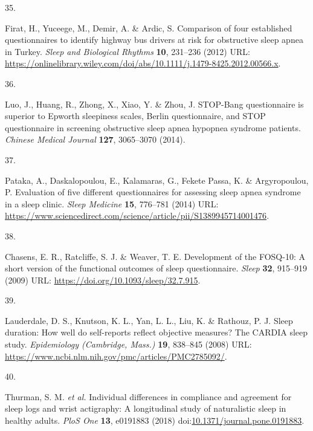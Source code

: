 \documentclass[
  9pt,
]{scrbook}
\newlength{\cslhangindent}
\newlength{\csllabelwidth}
\newlength{\cslentryspacingunit} %
\newenvironment{CSLReferences}[2] %
 {%
  \setlength{\parindent}{0pt}
  \ifodd #1
  \let\oldpar\par
  \def\par{\hangindent=\cslhangindent\oldpar}
  \fi
  \setlength{\parskip}{#2\cslentryspacingunit}
 }%
 {}
\newcommand{\CSLLeftMargin}[1]{\parbox[t]{\csllabelwidth}{#1}}
\newcommand{\CSLRightInline}[1]{\parbox[t]{\linewidth - \csllabelwidth}{#1}\break}
\begin{document}
\begin{CSLReferences}{0}{0}
\leavevmode{}%
\CSLLeftMargin{35. }%
\CSLRightInline{Firat, H., Yuceege, M., Demir, A. \& Ardic, S.
Comparison of four established questionnaires to identify highway bus
drivers at risk for obstructive sleep apnea in Turkey. \emph{Sleep and
Biological Rhythms} \textbf{10}, 231--236 (2012) URL:
\url{https://onlinelibrary.wiley.com/doi/abs/10.1111/j.1479-8425.2012.00566.x}.}

\leavevmode{}%
\CSLLeftMargin{36. }%
\CSLRightInline{Luo, J., Huang, R., Zhong, X., Xiao, Y. \& Zhou, J.
STOP-Bang questionnaire is superior to Epworth sleepiness scales, Berlin
questionnaire, and STOP questionnaire in screening obstructive sleep
apnea hypopnea syndrome patients. \emph{Chinese Medical Journal}
\textbf{127}, 3065--3070 (2014).}

\leavevmode{}%
\CSLLeftMargin{37. }%
\CSLRightInline{Pataka, A., Daskalopoulou, E., Kalamaras, G., Fekete
Passa, K. \& Argyropoulou, P. Evaluation of five different
questionnaires for assessing sleep apnea syndrome in a sleep clinic.
\emph{Sleep Medicine} \textbf{15}, 776--781 (2014) URL:
\url{https://www.sciencedirect.com/science/article/pii/S1389945714001476}.}

\leavevmode{}%
\CSLLeftMargin{38. }%
\CSLRightInline{Chasens, E. R., Ratcliffe, S. J. \& Weaver, T. E.
Development of the FOSQ-10: A short version of the functional outcomes
of sleep questionnaire. \emph{Sleep} \textbf{32}, 915--919 (2009) URL:
\url{https://doi.org/10.1093/sleep/32.7.915}.}

\leavevmode{}%
\CSLLeftMargin{39. }%
\CSLRightInline{Lauderdale, D. S., Knutson, K. L., Yan, L. L., Liu, K.
\& Rathouz, P. J. Sleep duration: How well do self-reports reflect
objective measures? The CARDIA sleep study. \emph{Epidemiology
(Cambridge, Mass.)} \textbf{19}, 838--845 (2008) URL:
\url{https://www.ncbi.nlm.nih.gov/pmc/articles/PMC2785092/}.}

\leavevmode{}%
\CSLLeftMargin{40. }%
\CSLRightInline{Thurman, S. M. \emph{et al.} Individual differences in
compliance and agreement for sleep logs and wrist actigraphy: A
longitudinal study of naturalistic sleep in healthy adults. \emph{PloS
One} \textbf{13}, e0191883 (2018)
doi:\href{https://doi.org/10.1371/journal.pone.0191883}{10.1371/journal.pone.0191883}.}


\end{CSLReferences}
\end{document}
